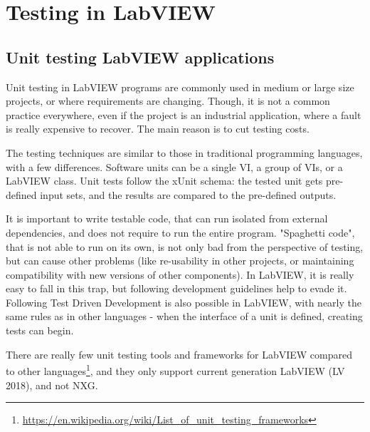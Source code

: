 \chapter{Testing in LabVIEW}

\section{Unit testing LabVIEW applications}
Unit testing in LabVIEW programs are commonly used in medium or large size projects, or where requirements are changing. Though, it is not a common practice everywhere, even if the project is an industrial application, where a fault is really expensive to recover. The main reason is to cut testing costs.

The testing techniques are similar to those in traditional programming languages, with a few differences. Software units can be a single VI, a group of VIs, or a LabVIEW class. Unit tests follow the xUnit schema: the tested unit gets pre-defined input sets, and the results are compared to the pre-defined outputs.

It is important to write testable code, that can run isolated from external dependencies, and does not require to run the entire program. "Spaghetti code", that is not able to run on its own, is not only bad from the perspective of testing, but can cause other problems (like re-usability in other projects, or maintaining compatibility with new versions of other components). In LabVIEW, it is really easy to fall in this trap, but following development guidelines help to evade it. Following Test Driven Development is also possible in LabVIEW, with nearly the same rules as in other languages - when the interface of a unit is defined, creating tests can begin. \cite{delacor_ni2014}

There are really few unit testing tools and frameworks for LabVIEW compared to other languages\footnote{\url{https://en.wikipedia.org/wiki/List_of_unit_testing_frameworks}}, and they only support current generation LabVIEW (LV 2018), and not NXG.

